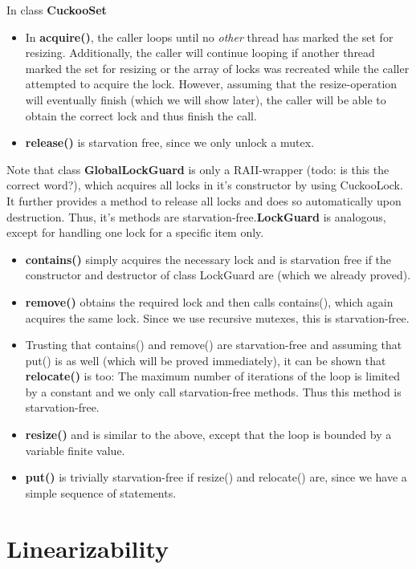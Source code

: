\documentclass[a4paper,10pt]{article}
\begin{document}
In class \textbf{CuckooSet}
\begin{itemize}
\item In \textbf{acquire()}, the caller loops until no \textit{other} thread has marked the set for resizing. Additionally, the caller will continue looping if another thread marked the set for resizing or the array of locks was recreated while the caller attempted to acquire the lock. However, assuming that the resize-operation will eventually finish (which we will show later), the caller will be able to obtain the correct lock and thus finish the call.
\item \textbf{release()} is starvation free, since we only unlock a mutex.
\end{itemize}
Note that class \textbf{GlobalLockGuard} is only a RAII-wrapper (todo: is this the correct word?), which acquires all locks in it's constructor by using CuckooLock. It further provides a method to release all locks and does so automatically upon destruction. Thus, it's methods are starvation-free.\textbf{LockGuard} is analogous, except for handling one lock for a specific item only. 

\begin{itemize}
\item \textbf{contains()} simply acquires the necessary lock and is starvation free if the constructor and destructor of class LockGuard are (which we already proved).
\item \textbf{remove()} obtains the required lock and then calls contains(), which again acquires the same lock. Since we use recursive mutexes, this is starvation-free. 
\item Trusting that contains() and remove() are starvation-free and assuming that put() is as well (which will be proved immediately), it can be shown that \textbf{relocate()} is too: The maximum number of iterations of the loop is limited by a constant and we only call starvation-free methods. Thus this method is starvation-free.
\item \textbf{resize()} and is similar to the above, except that the loop is bounded by a variable finite value.
\item \textbf{put()} is trivially starvation-free if resize() and relocate() are, since we have a simple sequence of statements. 
\end{itemize}

\section{Linearizability}
\label{serc:linearizability}
\end{document}
